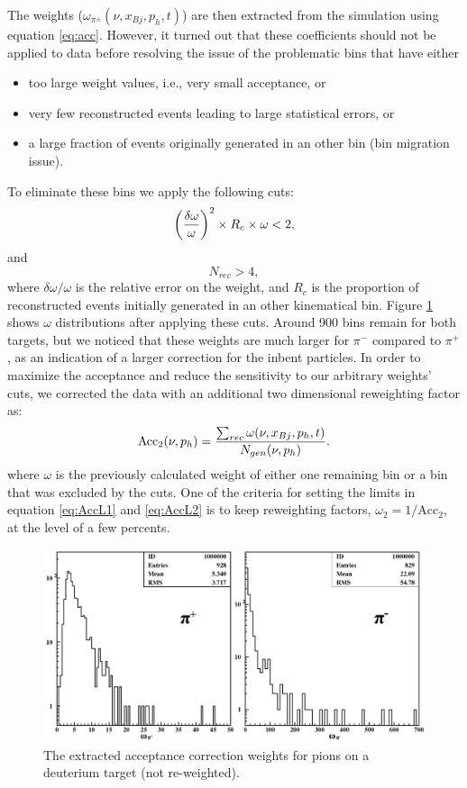 The weights ($\omega_{\pi^\pm}(\nu,x_{Bj},p_h,t)$) are then extracted from 
the simulation using equation \ref{eq:acc}. However, it turned out that these coefficients should not be applied to data before resolving the issue of the problematic bins that have either
\begin{itemize}
 \item too large weight values, i.e., very small acceptance, or
 \item very few reconstructed events leading to large statistical errors, or
 \item a large fraction of events originally generated in an other bin (bin migration issue).
\end{itemize}
To eliminate these bins we apply the following cuts:
\begin{equation} \label{eq:AccL1}
\left ({\delta \omega \over \omega}\right ) ^2 \times R_c \times \omega < 2,
\end{equation}
and
\begin{equation} \label{eq:AccL2}
N_{rec} > 4,
\end{equation}
where $\delta \omega / \omega$ is the relative error on the weight, and $R_c$ is the 
proportion of reconstructed events initially generated in an other kinematical bin. Figure \ref{fig:AccCoef} shows $\omega$ distributions after applying these cuts. Around 900 bins remain for both targets, but we noticed that these weights are much larger for $\pi^-$ compared to $\pi^+$, as an indication of a larger correction for the inbent particles. In order to maximize the acceptance and reduce the sensitivity to our arbitrary weights' cuts, we corrected the data with an additional two dimensional reweighting factor as:
\begin{equation}
\text{Acc}_2(\nu,p_h) = {\sum_{rec} \omega (\nu,x_{Bj},p_h,t)\over N_{gen}(\nu,p_h)}.
\end{equation}
where $\omega$ is the previously calculated weight of either one remaining bin or a bin that was excluded by the cuts. One of the criteria for setting the limits in equation \ref{eq:AccL1} and 
\ref{eq:AccL2} is to keep reweighting factors, $\omega_2 = 1/\text{Acc}_2$, at the level of a few percents.

\begin{figure}[tbp]
\centering
\includegraphics[width=14cm] {chap5-fig/pawpipdeut.png}
\caption {The extracted acceptance correction weights for pions on a deuterium target (not re-weighted).}
\label{fig:AccCoef}
\end{figure}

